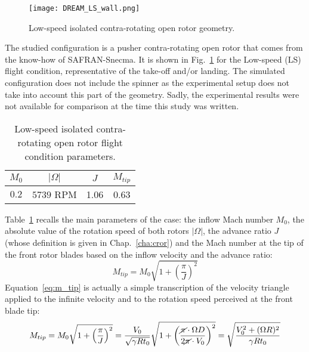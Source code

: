 

\begin{figure}[htp]
  \centering
  \texttt{[image: DREAM\_LS\_wall.png]}
  \caption{Low-speed isolated contra-rotating open rotor geometry.}
  \label{fig:dream_ls_wall}
\end{figure}

The studied configuration is a pusher contra-rotating open rotor
that comes from the know-how of SAFRAN-Snecma. 
It is shown in Fig.~\ref{fig:dream_ls_wall} for the
Low-speed (LS) flight condition, representative of the take-off
and/or landing.
The simulated configuration does not include the spinner as the
experimental setup does not take into account this part of the geometry.
Sadly, the experimental results were not available for comparison
at the time this study was written.

\begin{table}[htp]
   \centering
  \begin{tabular}{cccc}
    \toprule
    $M_0$ & $|\Omega|$ & $J$ & $M_{tip}$ \\
    \midrule
    $0.2$ & $5739$ RPM & 1.06 & 0.63 \\
    \bottomrule
  \end{tabular}
  \caption{Low-speed isolated contra-rotating open rotor flight condition parameters.}
  \label{tab:dream_ls_flight_condition}
\end{table} 
Table~\ref{tab:dream_ls_flight_condition} recalls the main
parameters of the case: the inflow Mach number $M_0$,
the absolute value of the rotation speed of both rotors $|\Omega|$,
the advance ratio $J$ (whose definition is given in Chap.~\ref{cha:cror})
and the Mach number at the tip of
the front rotor blades based on the inflow velocity and the advance ratio:
\begin{equation}
	M_{tip} = M_0 \sqrt{1 + \left(\frac{\pi}{J} \right)^2}
  \label{eq:m_tip}
\end{equation}
Equation~\ref{eq:m_tip} is actually a simple transcription of the velocity triangle
applied to the infinite velocity and to the rotation speed perceived
at the front blade tip:
\begin{equation}
    M_{tip} = M_0 \sqrt{1 + \left(\frac{\pi}{J}\right)^2} = 
    \frac{V_0}{\sqrt{\gamma R t_0}} \sqrt{1 + \left(\frac{
    	\cancel{\pi} \cdot \Omega D}{
    	2 \cancel{\pi} \cdot V_0}\right)^2} =
    \sqrt{\frac{V_0^2 + (\Omega R)^2}{\gamma R t_0}}
    \label{eq:m_tip_explained}
\end{equation}

